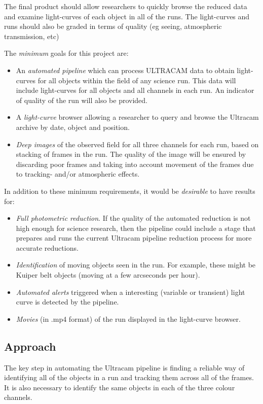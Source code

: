 \documentclass[a4paper,10pt]{article}
\begin{document}
The final product should allow researchers to quickly browse the reduced data and examine light-curves of each object in all of the 
runs. The light-curves and runs should also be graded in terms of quality (eg seeing, atmospheric transmission, etc) 

The \emph{minimum} goals for this project are:
\begin{itemize}
	\item An \emph{automated pipeline} which can process ULTRACAM data to obtain light-curves for all objects within the field of any science run. This data will include light-curves for all objects and all channels in each run. An indicator of quality of the run will also be provided. 
	\item A \emph{light-curve} browser allowing a researcher to query and browse the Ultracam archive by date, object and position.
	\item \emph{Deep images} of the observed field for all three channels for each run, based on stacking of frames in the run. The quality of the image will be ensured by discarding poor frames and taking into account movement of the frames due to tracking- and/or atmospheric effects. 
\end{itemize}

In addition to these minimum requirements, it would be \emph{desirable} to have results for:

\begin{itemize}
	\item \emph{Full photometric reduction}. If the quality of the automated reduction is not high enough for science research, then the pipeline could include a stage that prepares and runs the current Ultracam pipeline reduction process for more accurate reductions.
	\item \emph{Identification} of moving objects seen in the run. For example, these might be Kuiper belt objects (moving at a few arcseconds per hour).
	\item \emph{Automated alerts} triggered when a interesting (variable or transient) light curve is detected by the pipeline. 
	\item \emph{Movies} (in .mp4 format) of the run displayed in the light-curve browser. 
\end{itemize}

\subsection{Approach}
The key step in automating the Ultracam pipeline is finding a reliable way of identifying all of the objects in a run and tracking them across all of the frames. It is also necessary to identify the same objects in each of the three colour channels. 
\end{document}
